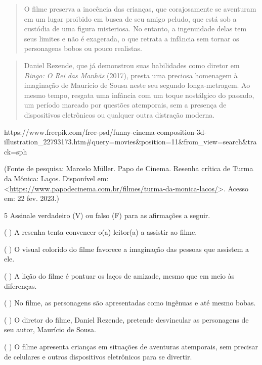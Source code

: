 \begin{quote}
O filme preserva a inocência das crianças, que corajosamente se
aventuram em um lugar proibido em busca de seu amigo peludo, que está
sob a custódia de uma figura misteriosa. No entanto, a ingenuidade delas
tem seus limites e não é exagerada, o que retrata a infância sem tornar
os personagens bobos ou pouco realistas.
\end{quote}

\begin{quote}
Daniel Rezende, que já demonstrou suas habilidades como diretor em
\emph{Bingo: O Rei das Manhãs} (2017), presta uma preciosa homenagem à
imaginação de Maurício de Sousa neste seu segundo longa-metragem. Ao
mesmo tempo, resgata uma infância com um toque nostálgico do passado, um
período marcado por questões atemporais, sem a presença de dispositivos
eletrônicos ou qualquer outra distração moderna.
\end{quote}

https://www.freepik.com/free-psd/funny-cinema-composition-3d-illustration\_22793173.htm\#query=movies\&position=11\&from\_view=search\&track=sph

(Fonte de pesquisa: Marcelo Müller. Papo de Cinema. Resenha crítica de
Turma da Mônica: Laços. Disponível em:
\textless{}\url{https://www.papodecinema.com.br/filmes/turma-da-monica-lacos/}\textgreater.
Acesso em: 22 fev. 2023.)

\num{5} Assinale verdadeiro (V) ou falso (F) para as afirmações a
seguir.

( ) A resenha tenta convencer o(a) leitor(a) a assistir ao filme.

( ) O visual colorido do filme favorece a imaginação das pessoas que
assistem a ele.

( ) A lição do filme é pontuar os laços de amizade, mesmo que em meio às
diferenças.

( ) No filme, as personagens são apresentadas como ingênuas e até mesmo
bobas.

( ) O diretor do filme, Daniel Rezende, pretende desvincular as
personagens de seu autor, Maurício de Sousa.

( ) O filme apresenta crianças em situações de aventuras atemporais, sem
precisar de celulares e outros dispositivos eletrônicos para se
divertir.


